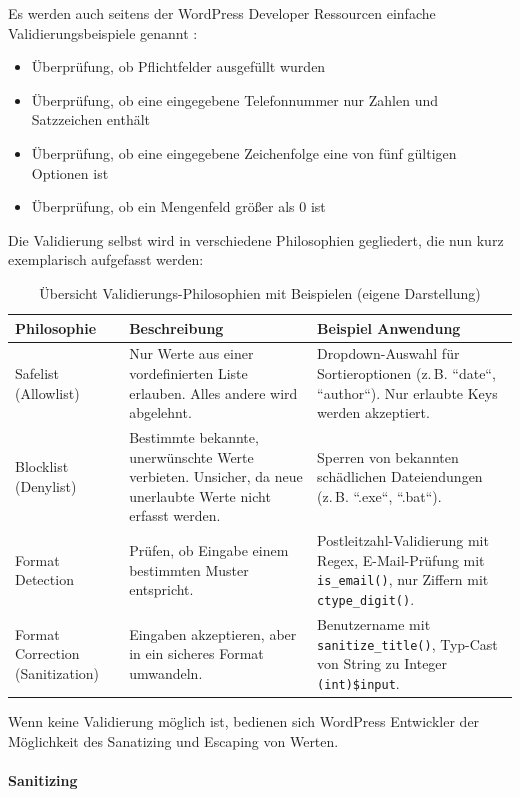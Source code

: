 Es werden auch seitens der WordPress Developer Ressourcen einfache Validierungsbeispiele genannt \cite{wordpress2024plugin_validation}:
\begin{itemize}
\item Überprüfung, ob Pflichtfelder ausgefüllt wurden
\item Überprüfung, ob eine eingegebene Telefonnummer nur Zahlen und Satzzeichen enthält
\item Überprüfung, ob eine eingegebene Zeichenfolge eine von fünf gültigen Optionen ist
\item Überprüfung, ob ein Mengenfeld größer als 0 ist
\end{itemize}
Die Validierung selbst wird in verschiedene Philosophien gegliedert, die nun kurz exemplarisch aufgefasst werden:
\begin{table}[h]
 \centering
 \renewcommand{\arraystretch}{1.3}
 \begin{tabular}{|p{3cm}|p{5cm}|p{6cm}|}
  \hline
  \textbf{Philosophie} & \textbf{Beschreibung} & \textbf{Beispiel Anwendung} \\
  \hline
  Safelist \newline (Allowlist)
  & Nur Werte aus einer vordefinierten Liste erlauben. Alles andere wird abgelehnt.
  & Dropdown-Auswahl für Sortieroptionen (z.\,B. ``date``, ``author``). Nur erlaubte Keys werden akzeptiert. \\
  \hline
  Blocklist \newline (Denylist)
  & Bestimmte bekannte, unerwünschte Werte verbieten. Unsicher, da neue unerlaubte Werte nicht erfasst werden.
  & Sperren von bekannten schädlichen Dateiendungen (z.\,B. ``.exe``, ``.bat``). \\
  \hline
  Format Detection
  & Prüfen, ob Eingabe einem bestimmten Muster entspricht.
  & Postleitzahl-Validierung mit Regex, E-Mail-Prüfung mit \texttt{is\_email()}, nur Ziffern mit \texttt{ctype\_digit()}. \\
  \hline
  Format Correction (Sanitization)
  & Eingaben akzeptieren, aber in ein sicheres Format umwandeln.
  & Benutzername mit  \newline \texttt{sanitize\_title()}, Typ-Cast von String zu Integer \texttt{(int)\$input}. \\
  \hline
 \end{tabular}
 \caption{Übersicht Validierungs-Philosophien mit Beispielen (eigene Darstellung)}
\end{table}

\newpage
Wenn keine Validierung möglich ist, bedienen sich WordPress Entwickler der Möglichkeit des Sanatizing und Escaping von Werten.
\\\\
\textbf{Sanitizing}

